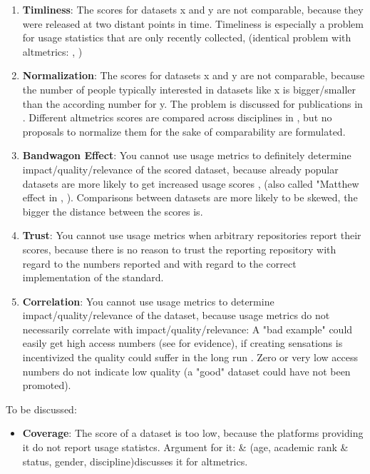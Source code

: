 \documentclass[conference, a4paper]{IEEEtran}\usepackage[]{graphicx}\usepackage[]{color}
\begin{document}
\begin{enumerate}
\item \textbf{Timliness}: The scores for datasets x and y are not comparable,
because they were released at two distant points in time.
Timeliness is especially a problem for usage statistics that are only recently collected,
        (identical problem with altmetrics: \cite{sh046}, \cite{sh059})
\item \textbf{Normalization}: The scores for datasets x and y are not comparable,
because the number of people typically interested in datasets like x is bigger/smaller than the according number for y.
The problem is discussed for publications in \cite{sh046}.
Different altmetrics scores are compared across disciplines in \cite{sh007},
but no proposals to normalize them for the sake of comparability are formulated.
\item \textbf{Bandwagon Effect}: You cannot use usage metrics to definitely determine impact/quality/relevance of the scored dataset,
because already popular datasets are more likely to get increased usage scores
        \cite{sh055}, \cite{sh056} (also called "Matthew effect in \cite{sh059}, \cite{ebm007}).
Comparisons between datasets are more likely to be skewed, the bigger the distance between the scores is.
\item \textbf{Trust}: You cannot use usage metrics when arbitrary repositories report their scores,
because there is no reason to trust the reporting repository with regard to
the numbers reported and with regard to the correct implementation of the standard.
\item \textbf{Correlation}: You cannot use usage metrics to determine impact/quality/relevance of the dataset,
because usage metrics do not necessarily correlate with impact/quality/relevance:
A "bad example" could easily get high access numbers (see \cite{sh060} for evidence),
if creating sensations is incentivized the quality could suffer in the long run
\cite{sh044}.
Zero or very low access numbers do not indicate low quality (a "good" dataset could have not been promoted).
\end{enumerate}

To be discussed:
\begin{itemize}
\item \textbf{Coverage}: The score of a dataset is too low,
    because the platforms providing it do not report usage statistcs.
        Argument for it: \cite{sh059} \& \cite{sh031} (age, academic rank \& status, gender, discipline)discusses it for altmetrics.
\end{itemize}
\end{document}
